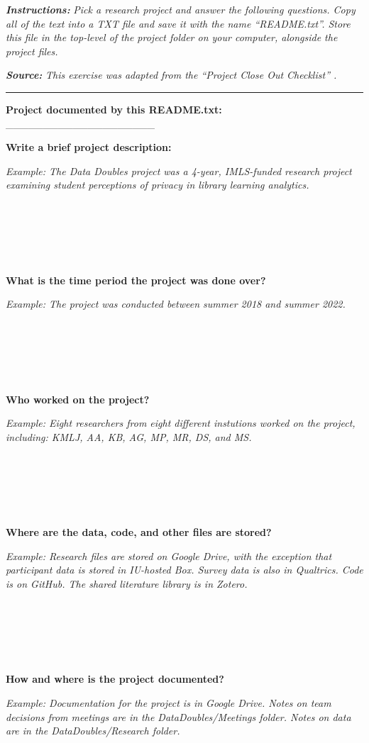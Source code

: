 \documentclass[
]{book}
\begin{document}
\textbf{\emph{Instructions:}} \emph{Pick a research project and answer the following questions. Copy all of the text into a TXT file and save it with the name ``README.txt''. Store this file in the top-level of the project folder on your computer, alongside the project files.}

\textbf{\emph{Source:}} \emph{This exercise was adapted from the ``Project Close Out Checklist'' \citep{briney_project_2020}.}

\begin{center}\rule{0.5\linewidth}{0.5pt}\end{center}

\textbf{Project documented by this README.txt:} \_\_\_\_\_\_\_\_\_\_\_\_\_\_\_\_\_\_\_\_

\textbf{Write a brief project description:}

\emph{Example: The Data Doubles project was a 4-year, IMLS-funded research project examining student perceptions of privacy in library learning analytics.}

~

~

~

\textbf{What is the time period the project was done over?}

\emph{Example: The project was conducted between summer 2018 and summer 2022.}

~

~

~

\textbf{Who worked on the project?}

\emph{Example: Eight researchers from eight different instutions worked on the project, including: KMLJ, AA, KB, AG, MP, MR, DS, and MS.}

~

~

~

\textbf{Where are the data, code, and other files are stored?}

\emph{Example: Research files are stored on Google Drive, with the exception that participant data is stored in IU-hosted Box. Survey data is also in Qualtrics. Code is on GitHub. The shared literature library is in Zotero.}

~

~

~

\textbf{How and where is the project documented?}

\emph{Example: Documentation for the project is in Google Drive. Notes on team decisions from meetings are in the DataDoubles/Meetings folder. Notes on data are in the DataDoubles/Research folder.}
\end{document}
